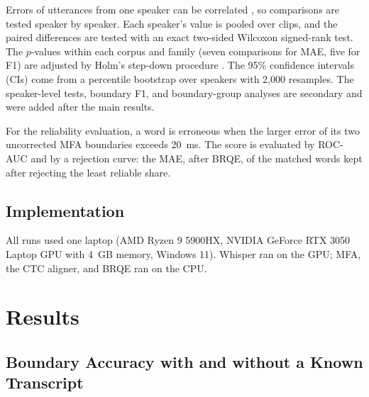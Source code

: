 \documentclass[conference,a4paper]{IEEEtran}
\begin{document}
Errors of utterances from one speaker can be correlated \cite{Liu2020Blockwise}, so comparisons are tested speaker by speaker. Each speaker's value is pooled over clips, and the paired differences are tested with an exact two-sided Wilcoxon signed-rank test. The $p$-values within each corpus and family (seven comparisons for MAE, five for F1) are adjusted by Holm's step-down procedure \cite{Holm1979}. The 95\% confidence intervals (CIs) come from a percentile bootstrap over speakers with 2,000 resamples. The speaker-level tests, boundary F1, and boundary-group analyses are secondary and were added after the main results.

For the reliability evaluation, a word is erroneous when the larger error of its two uncorrected MFA boundaries exceeds 20~ms. The score is evaluated by ROC-AUC and by a rejection curve: the MAE, after BRQE, of the matched words kept after rejecting the least reliable share.

\subsection{Implementation}
All runs used one laptop (AMD Ryzen 9 5900HX, NVIDIA GeForce RTX 3050 Laptop GPU with 4~GB memory, Windows 11). Whisper ran on the GPU; MFA, the CTC aligner, and BRQE ran on the CPU.

\section{Results}
\subsection{Boundary Accuracy with and without a Known Transcript}
\end{document}
